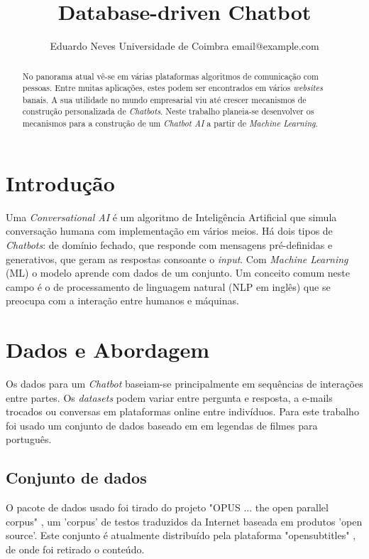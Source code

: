 \documentclass{article}
\title{Database-driven Chatbot}
\author{
    Eduardo Neves
    \affiliations
    Universidade de Coimbra
    \emails
    email@example.com
}
\begin{document}
\maketitle

\begin{abstract}
No panorama atual vê-se em várias plataformas algoritmos de comunicação com pessoas. Entre muitas aplicações, estes podem ser encontrados em vários \textit{websites} banais. A sua utilidade no mundo empresarial viu até crescer mecanismos de construção personalizada de \textit{Chatbots}. Neste trabalho planeia-se desenvolver os mecanismos para a construção de um \textit{Chatbot AI} a partir de \textit{Machine Learning}.
\end{abstract}

\section{Introdução}
Uma \textit{Conversational AI} é um algoritmo de Inteligência Artificial que simula conversação humana com implementação em vários meios. Há dois tipos de \textit{Chatbots}: de domínio fechado, que responde com mensagens pré-definidas e generativos, que geram as respostas consoante o \textit{input}. Com \textit{Machine Learning} (ML) o modelo aprende com dados de um conjunto. Um conceito comum neste campo é o de processamento de linguagem natural (NLP em inglês) que se preocupa com a interação entre humanos e máquinas. 


\section{Dados e Abordagem}
Os dados para um \textit{Chatbot} baseiam-se principalmente em sequências de interações entre partes. Os \textit{datasets} podem variar entre pergunta e resposta, a e-mails trocados ou conversas em plataformas online entre indivíduos. Para este trabalho foi usado um conjunto de dados baseado em em legendas de filmes para português.

\subsection{Conjunto de dados}
O pacote de dados usado foi tirado do projeto "OPUS ... the open parallel corpus" \cite{opus}, um 'corpus' de testos traduzidos da Internet baseada em produtos 'open source'. Este conjunto é atualmente distribuído pela plataforma "opensubtitles" \cite{opensubtitles} \cite{lison-tiedemann-2016-opensubtitles2016}, de onde foi retirado o conteúdo.
\end{document}
